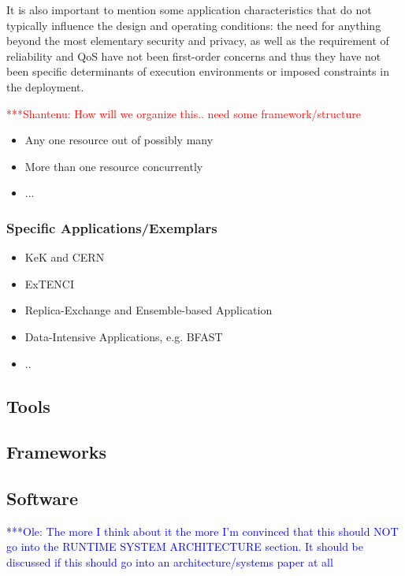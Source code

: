 \documentclass[a4paper,10pt]{article}
\newcommand{\jhanote}[1]{  {\textcolor{red}     { ***Shantenu: #1 }}}
\newcommand{\onote}[1]{  {\textcolor{blue}     { ***Ole: #1 }}}
\newcommand{\jhanote}[1]{}
\newcommand{\onote}[1]{}
\begin{document}
 It is also important to mention some application characteristics that
 do not typically influence the design and operating conditions: the
 need for anything beyond the most elementary security and privacy, as
 well as the requirement of reliability and QoS have not been
 first-order concerns and thus they have not been specific
 determinants of execution environments or imposed constraints in the
 deployment.

\jhanote{How will we organize this.. need some framework/structure}

\begin{itemize}
\item Any one resource out of possibly many
\item More than one resource concurrently
\item ...
\end{itemize}

\subsubsection{Specific Applications/Exemplars}

\begin{itemize}
\item KeK and CERN
\item ExTENCI
\item Replica-Exchange and Ensemble-based Application
\item Data-Intensive Applications, e.g. BFAST
\item .. 
\end{itemize}


 \subsection{Tools}
 \subsection{Frameworks}

  \subsection{Software }
  \onote{The more I think about it the more I'm convinced that this should NOT
  go into the RUNTIME SYSTEM ARCHITECTURE section. It should be discussed if
  this should go into an architecture/systems paper at all}
  
\end{document}
